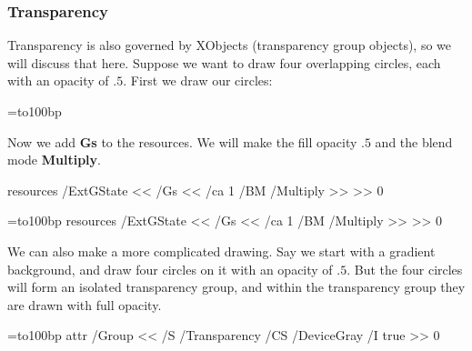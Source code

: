 \subsubsection{Transparency}

Transparency is also governed by XObjects (transparency group objects), so we will discuss that here.
Suppose we want to draw four overlapping circles, each with an opacity of $.5$.
First we draw our circles:

\blisting
\bgroup
{}=\hbox to100bp{\vrule width0bp height100bp depth0bp%
\hfil}
\elisting

\noindent Now we add {\bf Gs} to the resources.
We will make the fill opacity $.5$ and the blend mode {\bf Multiply}.

\blisting
\pdfxform resources{
    /ExtGState << /Gs <<
        /ca 1
        /BM /Multiply
    >> >>
}0
\xdef\fourcircs{\pdfrefxform\the\pdflastxform\relax}
\egroup
\elisting

\bgroup
{}=\hbox to100bp{\vrule width0bp height100bp depth0bp%
\hfil}
\pdfxform resources{
    /ExtGState << /Gs <<
        /ca 1
        /BM /Multiply
    >> >>
}0
\xdef\fourcircs{\pdfrefxform\the\pdflastxform\relax}
\egroup

\centerline{\fourcircs}

We can also make a more complicated drawing.
Say we start with a gradient background, and draw four circles on it with an opacity of $.5$.
But the four circles will form an isolated transparency group, and within the transparency group they are
drawn with full opacity.

\blisting
\bgroup
{}=\hbox to100bp{\vrule width0bp height100bp depth0bp%
\hfil}
\immediate\pdfxform attr{
    /Group <<
        /S /Transparency
        /CS /DeviceGray
        /I true
    >>
}0
\edef\fourcircsform{\the\pdflastxform}

